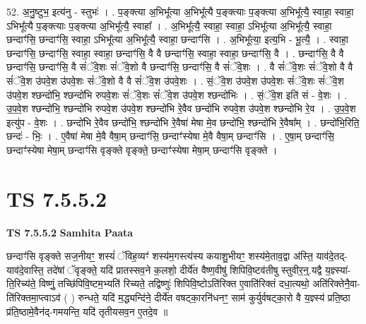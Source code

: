 \documentclass[17pt]{extarticle}
\begin{document}
52. अ॒नु॒ष्टुभ॒ इत्य॑नु - स्तुभः॑ । . प॒ङ्क्त्या अ॒भिभू᳚त्या अ॒भिभू᳚त्यै प॒ङ्क्त्याः प॒ङ्क्त्या अ॒भिभू᳚त्यै॒ स्वाहा॒ स्वाहा॒ ऽभिभू᳚त्यै प॒ङ्क्त्याः प॒ङ्क्त्या अ॒भिभू᳚त्यै॒ स्वाहा᳚ । . अ॒भिभू᳚त्यै॒ स्वाहा॒ स्वाहा॒ ऽभिभू᳚त्या अ॒भिभू᳚त्यै॒ स्वाहा॒ छन्दाꣳ॑सि॒ छन्दाꣳ॑सि॒ स्वाहा॒ ऽभिभू᳚त्या अ॒भिभू᳚त्यै॒ स्वाहा॒ छन्दाꣳ॑सि । . अ॒भिभू᳚त्या॒ इत्य॒भि - भू॒त्यै॒ । . स्वाहा॒ छन्दाꣳ॑सि॒ छन्दाꣳ॑सि॒ स्वाहा॒ स्वाहा॒ छन्दाꣳ॑सि॒ वै वै छन्दाꣳ॑सि॒ स्वाहा॒ स्वाहा॒ छन्दाꣳ॑सि॒ वै । . छन्दाꣳ॑सि॒ वै वै छन्दाꣳ॑सि॒ छन्दाꣳ॑सि॒ वै सं॑ॅवे॒शः सं॑ॅवे॒शो वै छन्दाꣳ॑सि॒ छन्दाꣳ॑सि॒ वै सं॑ॅवे॒शः । . वै सं॑ॅवे॒शः सं॑ॅवे॒शो वै वै सं॑ॅवे॒श उ॑पवे॒श उ॑पवे॒शः सं॑ॅवे॒शो वै वै सं॑ॅवे॒श उ॑पवे॒शः । . सं॒ॅवे॒श उ॑पवे॒श उ॑पवे॒शः सं॑ॅवे॒शः सं॑ॅवे॒श उ॑पवे॒श श्छन्दो॑भि॒ श्छन्दो॑भि रुपवे॒शः सं॑ॅवे॒शः सं॑ॅवे॒श उ॑पवे॒श श्छन्दो॑भिः । . सं॒ॅवे॒श इति॑ सं - वे॒शः । . उ॒प॒वे॒श श्छन्दो॑भि॒ श्छन्दो॑भि रुपवे॒श उ॑पवे॒श श्छन्दो॑भि रे॒वैव छन्दो॑भि रुपवे॒श उ॑पवे॒श श्छन्दो॑भि रे॒व । . उ॒प॒वे॒श इत्यु॑प - वे॒शः । . छन्दो॑भि रे॒वैव छन्दो॑भि॒ श्छन्दो॑भि रे॒वैषा॑ मेषा मे॒व छन्दो॑भि॒ श्छन्दो॑भि रे॒वैषा᳚म् । . छन्दो॑भि॒रिति॒ छन्दः॑ - भिः॒ । . ए॒वैषा॑ मेषा मे॒वै वैषा॒म् छन्दाꣳ॑सि॒ छन्दाꣳ॑स्येषा मे॒वै वैषा॒म् छन्दाꣳ॑सि । . ए॒षा॒म् छन्दाꣳ॑सि॒ छन्दाꣳ॑स्येषा मेषा॒म् छन्दाꣳ॑सि वृङ्क्ते वृङ्क्ते॒ छन्दाꣳ॑स्येषा मेषा॒म् छन्दाꣳ॑सि वृङ्क्ते । \newline
\pagebreak
{}

\section{ TS 7.5.5.2 }

\textbf{TS 7.5.5.2 } \newline
\textbf{Samhita Paata} \newline

छन्दाꣳ॑सि वृङ्क्ते सज॒नीयꣳ॒॒ शस्यं॑ ॅविह॒व्यꣳ॑ शस्य॑म॒गस्त्य॑स्य कयाशु॒भीयꣳ॒॒ शस्य॑मे॒ताव॒द्वा अ॑स्ति॒ याव॑दे॒तद्-याव॑दे॒वास्ति॒ तदे॑षां ॅवृङ्क्ते॒ यदि॑ प्रातस्सव॒ने क॒लशो॒ दीर्ये॑त वैष्ण॒वीषु॑ शिपिवि॒ष्टव॑तीषु स्तुवीर॒न्॒.यद्वै य॒ज्ञ्स्या॑-ति॒रिच्य॑ते॒ विष्णुं॒ तच्छि॑पिवि॒ष्टम॒भ्यति॑ रिच्यते॒ तद्विष्णुः॑ शिपिवि॒ष्टोऽति॑रिक्त ए॒वाति॑रिक्तं दधा॒त्यथो॒ अति॑रिक्तेनै॒वा-ति॑रिक्तमा॒प्त्वाऽव॑ ( ) रुन्धते॒ यदि॑ म॒द्ध्यन्दि॑ने॒ दीर्ये॑त वषट्का॒रनि॑धनꣳ॒॒ साम॑ कुर्युर्वषट्का॒रो वै य॒ज्ञ्स्य॑ प्रति॒ष्ठा प्र॑ति॒ष्ठामे॒वैन॑द्-गमयन्ति॒ यदि॑ तृतीयसव॒न ए॒तदे॒व ॥ \newline
\end{document}
